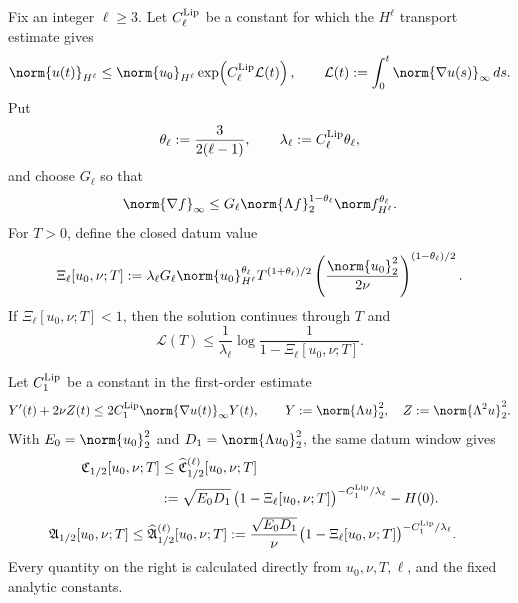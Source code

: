 \begin{proposition}
\label{prop:finite-order-datum-window}
Fix an integer \(\ell\ge3\).  Let \(C_\ell^{\rm Lip}\) be a constant for
which the \(H^\ell\) transport estimate gives
\begin{equation}
 \norm{u(t)}_{H^\ell}
 \le \norm{u_0}_{H^\ell}
 \exp\!\left(C_\ell^{\rm Lip}\mathcal L(t)\right),
 \qquad
 \mathcal L(t):=\int_0^t\norm{\nabla u(s)}_\infty\,ds.
 \label{eq:finite-order-lipschitz-persistence}
\end{equation}
Put
\begin{equation}
 \theta_\ell:=\frac{3}{2(\ell-1)},
 \qquad
 \lambda_\ell:=C_\ell^{\rm Lip}\theta_\ell,
 \label{eq:finite-order-window-exponents}
\end{equation}
and choose \(G_\ell\) so that
\begin{equation}
 \norm{\nabla f}_\infty
 \le G_\ell
 \norm{\Lambda f}_2^{1-\theta_\ell}
 \norm f_{H^\ell}^{\theta_\ell}.
 \label{eq:finite-order-fourier-split}
\end{equation}
For \(T>0\), define the closed datum value
\begin{equation}
 \Xi_\ell[u_0,\nu;T]
 :=\lambda_\ell G_\ell
 \norm{u_0}_{H^\ell}^{\theta_\ell}
 T^{(1+\theta_\ell)/2}
 \left(\frac{\norm{u_0}_2^2}{2\nu}\right)^{(1-\theta_\ell)/2}.
 \label{eq:finite-order-window-value}
\end{equation}
If \(\Xi_\ell[u_0,\nu;T]<1\), then the solution continues through \(T\)
and
\begin{equation}
 \mathcal L(T)
 \le \frac1{\lambda_\ell}
 \log\frac1{1-\Xi_\ell[u_0,\nu;T]}.
 \label{eq:finite-order-lipschitz-clock}
\end{equation}

Let \(C_1^{\rm Lip}\) be a constant in the first-order estimate
\begin{equation}
 Y'(t)+2\nu Z(t)
 \le2C_1^{\rm Lip}\norm{\nabla u(t)}_\infty Y(t),
 \qquad
 Y:=\norm{\Lambda u}_2^2,
 \quad Z:=\norm{\Lambda^2u}_2^2.
 \label{eq:lipschitz-enstrophy-row}
\end{equation}
With \(E_0=\norm{u_0}_2^2\) and
\(D_1=\norm{\Lambda u_0}_2^2\), the same datum window gives
\begin{equation}
\begin{aligned}
 \mathfrak C_{1/2}[u_0,\nu;T]
 &\le \widehat{\mathfrak C}_{1/2}^{(\ell)}[u_0,\nu;T]
 \\
 &:=\sqrt{E_0D_1}\,
 \bigl(1-\Xi_\ell[u_0,\nu;T]\bigr)^{
 -C_1^{\rm Lip}/\lambda_\ell}
 -H(0).
\end{aligned}
\label{eq:finite-order-critical-prefix}
\end{equation}
\begin{equation}
\begin{aligned}
 \mathfrak A_{1/2}[u_0,\nu;T]
 &\le \widehat{\mathfrak A}_{1/2}^{(\ell)}[u_0,\nu;T]
 :=\frac{\sqrt{E_0D_1}}{\nu}
 \bigl(1-\Xi_\ell[u_0,\nu;T]\bigr)^{
 -C_1^{\rm Lip}/\lambda_\ell}.
\end{aligned}
\label{eq:finite-order-critical-coefficient}
\end{equation}
Every quantity on the right is calculated directly from
\(u_0,\nu,T,\ell\), and the fixed analytic constants.
\end{proposition}

